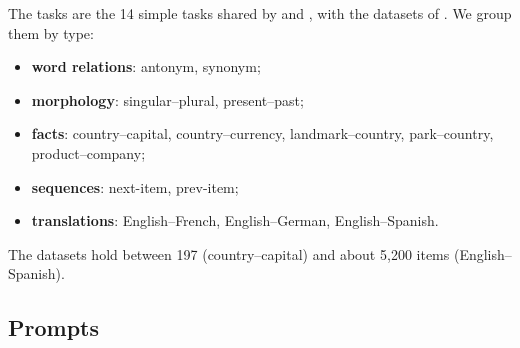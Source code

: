 \documentclass[10pt,a4paper]{article}
\begin{document}
The tasks are the 14 simple tasks shared by \citet{yang2026shared} and \citet{davidson2025different}, with the datasets of \citet{todd2024function}. We group them by type:
\begin{itemize}
\item \textbf{word relations}: antonym, synonym;
\item \textbf{morphology}: singular--plural, present--past;
\item \textbf{facts}: country--capital, country--currency, landmark--country, park--country, product--company;
\item \textbf{sequences}: next-item, prev-item;
\item \textbf{translations}: English--French, English--German, English--Spanish.
\end{itemize}
The datasets hold between 197 (country--capital) and about 5{,}200 items (English--Spanish).

\subsection{Prompts}\label{sec:prompts}
\end{document}
